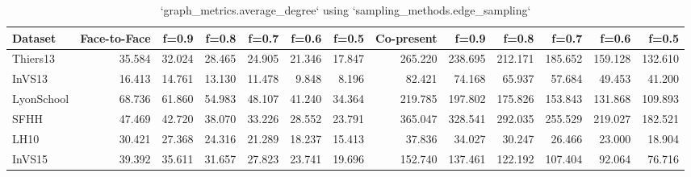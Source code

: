 \begin{table}[ht]
\begin{tabular}{lrrrrrrrrrrrr}
\hline
 Dataset    &   Face-to-Face &   f=0.9 &   f=0.8 &   f=0.7 &   f=0.6 &   f=0.5 &   Co-present &   f=0.9 &   f=0.8 &   f=0.7 &   f=0.6 &   f=0.5 \\
\hline
 Thiers13   &         35.584 &  32.024 &  28.465 &  24.905 &  21.346 &  17.847 &      265.220 & 238.695 & 212.171 & 185.652 & 159.128 & 132.610 \\
 InVS13     &         16.413 &  14.761 &  13.130 &  11.478 &   9.848 &   8.196 &       82.421 &  74.168 &  65.937 &  57.684 &  49.453 &  41.200 \\
 LyonSchool &         68.736 &  61.860 &  54.983 &  48.107 &  41.240 &  34.364 &      219.785 & 197.802 & 175.826 & 153.843 & 131.868 & 109.893 \\
 SFHH       &         47.469 &  42.720 &  38.070 &  33.226 &  28.552 &  23.791 &      365.047 & 328.541 & 292.035 & 255.529 & 219.027 & 182.521 \\
 LH10       &         30.421 &  27.368 &  24.316 &  21.289 &  18.237 &  15.413 &       37.836 &  34.027 &  30.247 &  26.466 &  23.000 &  18.904 \\
 InVS15     &         39.392 &  35.611 &  31.657 &  27.823 &  23.741 &  19.696 &      152.740 & 137.461 & 122.192 & 107.404 &  92.064 &  76.716 \\
\hline
\end{tabular}
\caption{`graph_metrics.average_degree` using `sampling_methods.edge_sampling`}
\end{table}